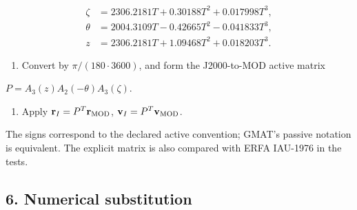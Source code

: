 \documentclass[10pt,a4paper]{article}
\numberwithin{equation}{section}
\begin{document}
\begin{equation}\begin{aligned}
\zeta&=2306.2181T+0.30188T^2+0.017998T^3,\\
\theta&=2004.3109T-0.42665T^2-0.041833T^3,\\
z&=2306.2181T+1.09468T^2+0.018203T^3.
\end{aligned}\label{eq:ch1-6}\end{equation}

\begin{enumerate}[start=5]
\item Convert by \(\pi/(180\cdot3600)\), and form the J2000-to-MOD active matrix
\end{enumerate}
\begin{sloppypar}\(P=A_3(z)A_2(-\theta)A_3(\zeta)\).\end{sloppypar}

\begin{enumerate}[start=6]
\item Apply \(\mathbf r_I=P^T\mathbf r_{\rm MOD}\), \(\mathbf v_I=P^T\mathbf v_{\rm MOD}\).
\end{enumerate}

\begin{sloppypar}The signs correspond to the declared active convention; GMAT's passive notation is equivalent. The explicit matrix is also compared with ERFA IAU-1976 in the tests.\end{sloppypar}


\subsection*{6. Numerical substitution}
\end{document}

